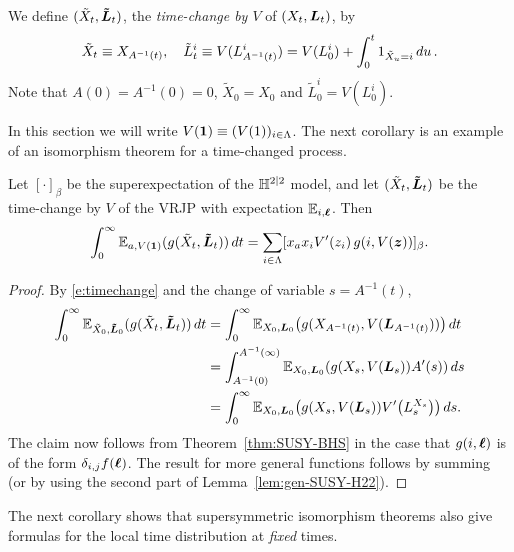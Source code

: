 \documentclass[11pt,a4paper]{article}
\let\originalleft\left
\let\originalright\right
\renewcommand{\left}{\mathopen{}\mathclose\bgroup\originalleft}
\renewcommand{\right}{\aftergroup\egroup\originalright}
\begin{document}
We define $(\tilde X_{t},\boldsymbol{\tilde L}_{t})$, the \emph{time-change by
  $V$} of $(X_{t},\boldsymbol{L}_{t})$, by
\begin{equation}
\label{e:timechange}
\tilde X_{t}\equiv X_{A^{-1}(t)}, \quad \tilde L_t^i \equiv
V(L_{A^{-1}(t)}^i) = V(L_0^i) + \int_0^t 1_{\tilde X_u=i}\,du \,.
\end{equation}
Note that $A(0) = A^{-1}(0) = 0$, $\tilde X_{0}=X_{0}$ and
$\tilde L_0^i = V(L_{0}^i)$.  

In this section we will write
$V(\boldsymbol{1}) \equiv (V(1))_{i\in\Lambda}$. The next corollary is an
example of an isomorphism theorem for a time-changed process.

\begin{corollary} 
  \label{c:DynkinV}
  Let $[\cdot]_\beta$ be the superexpectation of the $\mathbb{H}^{2|2}$ model, and
  let $(\tilde X_t,\boldsymbol{\tilde L}_t)$ be the time-change by $V$ of the VRJP
  with expectation $\mathbb{E}_{i,\boldsymbol{\ell}}$.
  Then
  \begin{equation}
    \int_0^\infty \mathbb{E}_{a,V(\boldsymbol{1})}(g(\tilde{X}_t,\boldsymbol{\tilde L}_t)) \, dt
    =
    \sum_{i\in\Lambda} [{x_a x_i V'(z_i) \, g(i,V(\boldsymbol{z}))}]_{\beta}
    .
  \end{equation}
\end{corollary}

\begin{proof}
  By \eqref{e:timechange} and the change of variable $s = A^{-1}(t)$,
  \begin{align}
    \int_{0}^{\infty} \E_{\tilde X_0, \V{\tilde L}_0}(g(\tilde X_t, \V{\tilde L}_t))\,dt 
    &= \int_{0}^{\infty} \E_{X_0, \V{L}_0}\left(g(X_{A^{-1}(t)}, V(\V{L}_{A^{-1}(t)}))\right)\,dt
      \nnb
    &= \int_{A^{-1}(0)}^{A^{-1}(\infty)} \E_{X_0, \V{L}_0}\left(g(X_{s}, V(\V{L}_{s})) A'(s)\right)\,ds
      \nnb
    &= \int_{0}^{\infty} \E_{X_0, \V{L}_0}\left(g(X_{s}, V(\V{L}_{s}))
      V'\left(L_{s}^{X_s}\right)\right)\,ds.
  \end{align}
  The claim now follows from Theorem~\ref{thm:SUSY-BHS} in the
  case that $g(i,\boldsymbol{\ell})$ is of the form $\delta_{i,j}f(\boldsymbol{\ell})$.
  The result for
  more general functions follows by summing (or by using the second
  part of Lemma~\ref{lem:gen-SUSY-H22}).
\end{proof}


The next corollary shows that supersymmetric isomorphism
theorems also give formulas for the local time distribution at
\emph{fixed} times.
\end{document}
